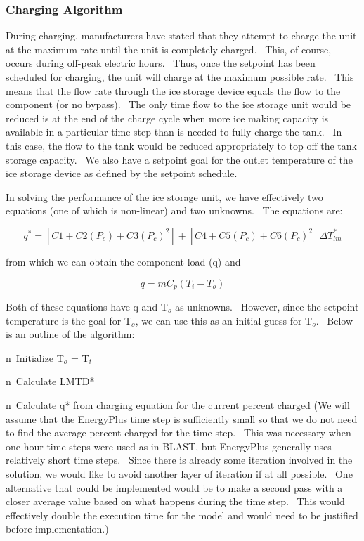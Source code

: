 \subsubsection{Charging Algorithm}\label{charging-algorithm}

During charging, manufacturers have stated that they attempt to charge the unit at the maximum rate until the unit is completely charged.~ This, of course, occurs during off-peak electric hours.~ Thus, once the setpoint has been scheduled for charging, the unit will charge at the maximum possible rate.~ This means that the flow rate through the ice storage device equals the flow to the component (or no bypass).~ The only time flow to the ice storage unit would be reduced is at the end of the charge cycle when more ice making capacity is available in a particular time step than is needed to fully charge the tank.~ In this case, the flow to the tank would be reduced appropriately to top off the tank storage capacity. ~We also have a setpoint goal for the outlet temperature of the ice storage device as defined by the setpoint schedule.

In solving the performance of the ice storage unit, we have effectively two equations (one of which is non-linear) and two unknowns.~ The equations are:

\begin{equation}
{q^*} = \left[ {C1 + C2\left( {{P_c}} \right) + C3{{\left( {{P_c}} \right)}^2}} \right] + \left[ {C4 + C5\left( {{P_c}} \right) + C6{{\left( {{P_c}} \right)}^2}} \right]\Delta T_{lm}^*
\end{equation}

from which we can obtain the component load (q) and

\begin{equation}
q = \dot m{C_p}\left( {{T_i} - {T_o}} \right)
\end{equation}

Both of these equations have q and T\(_{o}\) as unknowns.~ However, since the setpoint temperature is the goal for T\(_{o}\), we can use this as an initial guess for T\(_{o}\).~ Below is an outline of the algorithm:

n~Initialize T\(_{o}\) = T\(_{t}\)

n~Calculate LMTD*

n~Calculate q* from charging equation for the current percent charged (We will assume that the EnergyPlus time step is sufficiently small so that we do not need to find the average percent charged for the time step.~ This was necessary when one hour time steps were used as in BLAST, but EnergyPlus generally uses relatively short time steps.~ Since there is already some iteration involved in the solution, we would like to avoid another layer of iteration if at all possible.~ One alternative that could be implemented would be to make a second pass with a closer average value based on what happens during the time step.~ This would effectively double the execution time for the model and would need to be justified before implementation.)

